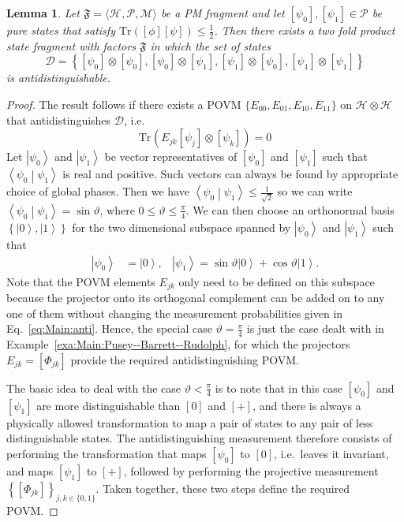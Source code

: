 \documentclass[DIV=calc,paper=a4,fontsize=11pt,twocolumn]{scrartcl} %
\theoremstyle{definition}
\theoremstyle{plain}
\newtheorem{lemma}[definition]{Lemma}
\newcommand{\Ket}[1]{\ensuremath{\left \vert #1 \right \rangle}}
\newcommand{\BraKet}[2]{\ensuremath{\left \langle #1 \middle \vert #2
\right \rangle}}
\newcommand{\Proj}[1]{\ensuremath{\left [ #1 \right ]}}
\newcommand{\Hilb}[1][]{\ensuremath{\mathcal{H}_{#1}}}
\newcommand{\Tr}[2][]{\ensuremath{\text{Tr}_{#1} \left ( #2 \right )}}
\begin{document}
\begin{lemma}
\label{lem:Main:anti}
Let $\mathfrak{F} = \langle \Hilb, \mathcal{P}, \mathcal{M} \rangle$
be a PM fragment and let $\Proj{\psi_0}, \Proj{\psi_1} \in
\mathcal{P}$ be pure states that satisfy $\mathrm{Tr} \left (
\Proj{\phi}\Proj{\psi} \right ) \leq \frac{1}{2}$.  Then there
exists a two fold product state fragment with factors $\mathfrak{F}$
in which the set of states
\begin{equation}
\mathcal{D} = \left \{\Proj{\psi_0} \otimes \Proj{\psi_0},
\Proj{\psi_0} \otimes \Proj{\psi_1}, \Proj{\psi_1} \otimes
\Proj{\psi_0}, \Proj{\psi_1} \otimes \Proj{\psi_1} \right \}
\end{equation}
is antidistinguishable.
\end{lemma}
\begin{proof}
The result follows if there exists a POVM
$\{E_{00},E_{01},E_{10},E_{11}\}$ on $\Hilb \otimes \Hilb$ that
antidistinguishes $\mathcal{D}$, i.e.
\begin{equation}
\label{eq:Main:anti}
\Tr{E_{jk} \Proj{\psi_j} \otimes \Proj{\psi_k}} = 0
\end{equation}
Let $\Ket{\psi_0}$ and $\Ket{\psi_1}$ be vector representatives of
$\Proj{\psi_0}$ and $\Proj{\psi_1}$ such that
$\BraKet{\psi_0}{\psi_1}$ is real and positive.  Such vectors can
always be found by appropriate choice of global phases.  Then we
have $\BraKet{\psi_0}{\psi_1} \leq \frac{1}{\sqrt{2}}$ so we can
write $\BraKet{\psi_0}{\psi_1} = \sin \vartheta$, where $0 \leq
\vartheta \leq \frac{\pi}{4}$.  We can then choose an orthonormal
basis $\left \{ \Ket{0}, \Ket{1} \right \}$ for the two dimensional
subspace spanned by $\Ket{\psi_0}$ and $\Ket{\psi_1}$ such that
\begin{align}
\Ket{\psi_0} & = \Ket{0}, & \Ket{\psi_1} = \sin \vartheta \Ket{0}
+ \cos \vartheta \Ket{1}.
\end{align}
Note that the POVM elements $E_{jk}$ only need to be defined on this
subspace because the projector onto its orthogonal complement can be
added on to any one of them without changing the measurement
probabilities given in Eq.~\eqref{eq:Main:anti}.  Hence, the special
case $\vartheta = \frac{\pi}{4}$ is just the case dealt with in
Example~\ref{exa:Main:Pusey--Barrett--Rudolph}, for which the projectors $E_{jk} =
\Proj{\Phi_{jk}}$ provide the required antidistinguishing POVM.

The basic idea to deal with the case $\vartheta < \frac{\pi}{4}$ is
to note that in this case $\Proj{\psi_0}$ and $\Proj{\psi_1}$ are
more distinguishable than $\Proj{0}$ and $\Proj{+}$, and there is
always a physically allowed transformation to map a pair of states
to any pair of less distinguishable states.  The antidistinguishing
measurement therefore consists of performing the transformation
that maps $\Proj{\psi_0}$ to $\Proj{0}$, i.e.\ leaves it invariant,
and maps $\Proj{\psi_1}$ to $\Proj{+}$, followed by performing the
projective measurement $\left \{ \Proj{\Phi_{jk}} \right \}_{j,k \in
\{0,1\}}$.  Taken together, these two steps define the required
POVM.


\end{proof}
\end{document}
